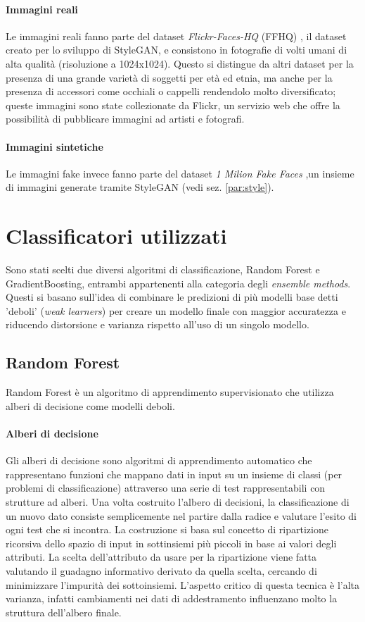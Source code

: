 \paragraph{Immagini reali}Le immagini reali fanno parte del dataset \textit{Flickr-Faces-HQ} (FFHQ) \cite{NVlabsFfhqdataset2025}, il dataset creato per lo sviluppo di StyleGAN, e consistono in fotografie di volti umani di alta qualità (risoluzione a 1024x1024). Questo si distingue da altri dataset per la presenza di una grande varietà di soggetti per età ed etnia, ma anche per la presenza di accessori come occhiali o cappelli \cite{karras2019style} rendendolo molto diversificato; queste immagini sono state collezionate da Flickr, un servizio web che offre la possibilità di pubblicare immagini ad artisti e fotografi.
\paragraph{Immagini sintetiche}Le immagini fake invece fanno parte del dataset \textit{1 Milion Fake Faces} ,un insieme di immagini generate tramite StyleGAN (vedi sez. \ref{par:style}). 
\section{Classificatori utilizzati}
Sono stati scelti due diversi algoritmi di classificazione, Random Forest e GradientBoosting, entrambi appartenenti alla categoria degli \textit{ensemble methods}. Questi si basano sull'idea di combinare le predizioni di più modelli base detti 'deboli' (\textit{weak learners}) per creare un modello finale con maggior accuratezza e riducendo distorsione e varianza rispetto all'uso di un singolo modello.
\subsection{Random Forest}
Random Forest è un algoritmo di apprendimento supervisionato che utilizza alberi di decisione come modelli deboli.
\paragraph{Alberi di decisione}
Gli alberi di decisione sono algoritmi di apprendimento automatico che rappresentano funzioni che mappano dati in input su un insieme di classi (per problemi di classificazione) attraverso una serie di test rappresentabili con strutture ad alberi. Una volta costruito l'albero di decisioni, la classificazione di un nuovo dato consiste semplicemente nel partire dalla radice e valutare l'esito di ogni test che si incontra. La costruzione si basa sul concetto di ripartizione ricorsiva dello spazio di input in sottinsiemi più piccoli in base ai valori degli attributi. La scelta dell'attributo da usare per la ripartizione viene fatta valutando il guadagno informativo derivato da quella scelta, cercando di minimizzare l'impurità dei sottoinsiemi.
L'aspetto critico di questa tecnica è l'alta varianza, infatti cambiamenti nei dati di addestramento influenzano molto la struttura dell'albero finale.
